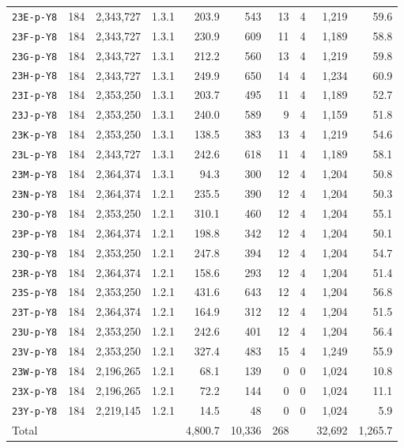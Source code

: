 \documentclass[11pt]{amsart}
\theoremstyle{definition}
\theoremstyle{remark}
\begin{document}
\begin{table}[ht]
\begin{tabular}{@{}lrrcrrrrrr@{}}
\texttt{23E-p-Y8} & 184 & 2{,}343{,}727 & 1.3.1 & 203.9 & 543 & 13 & 4 & 1{,}219 & 59.6 \\
\texttt{23F-p-Y8} & 184 & 2{,}343{,}727 & 1.3.1 & 230.9 & 609 & 11 & 4 & 1{,}189 & 58.8 \\
\texttt{23G-p-Y8} & 184 & 2{,}343{,}727 & 1.3.1 & 212.2 & 560 & 13 & 4 & 1{,}219 & 59.8 \\
\texttt{23H-p-Y8} & 184 & 2{,}343{,}727 & 1.3.1 & 249.9 & 650 & 14 & 4 & 1{,}234 & 60.9 \\
\texttt{23I-p-Y8} & 184 & 2{,}353{,}250 & 1.3.1 & 203.7 & 495 & 11 & 4 & 1{,}189 & 52.7 \\
\texttt{23J-p-Y8} & 184 & 2{,}353{,}250 & 1.3.1 & 240.0 & 589 & 9 & 4 & 1{,}159 & 51.8 \\
\texttt{23K-p-Y8} & 184 & 2{,}353{,}250 & 1.3.1 & 138.5 & 383 & 13 & 4 & 1{,}219 & 54.6 \\
\texttt{23L-p-Y8} & 184 & 2{,}343{,}727 & 1.3.1 & 242.6 & 618 & 11 & 4 & 1{,}189 & 58.1 \\
\texttt{23M-p-Y8} & 184 & 2{,}364{,}374 & 1.3.1 & 94.3 & 300 & 12 & 4 & 1{,}204 & 50.8 \\
\texttt{23N-p-Y8} & 184 & 2{,}364{,}374 & 1.2.1 & 235.5 & 390 & 12 & 4 & 1{,}204 & 50.3 \\
\texttt{23O-p-Y8} & 184 & 2{,}353{,}250 & 1.2.1 & 310.1 & 460 & 12 & 4 & 1{,}204 & 55.1 \\
\texttt{23P-p-Y8} & 184 & 2{,}364{,}374 & 1.2.1 & 198.8 & 342 & 12 & 4 & 1{,}204 & 50.1 \\
\texttt{23Q-p-Y8} & 184 & 2{,}353{,}250 & 1.2.1 & 247.8 & 394 & 12 & 4 & 1{,}204 & 54.7 \\
\texttt{23R-p-Y8} & 184 & 2{,}364{,}374 & 1.2.1 & 158.6 & 293 & 12 & 4 & 1{,}204 & 51.4 \\
\texttt{23S-p-Y8} & 184 & 2{,}353{,}250 & 1.2.1 & 431.6 & 643 & 12 & 4 & 1{,}204 & 56.8 \\
\texttt{23T-p-Y8} & 184 & 2{,}364{,}374 & 1.2.1 & 164.9 & 312 & 12 & 4 & 1{,}204 & 51.5 \\
\texttt{23U-p-Y8} & 184 & 2{,}353{,}250 & 1.2.1 & 242.6 & 401 & 12 & 4 & 1{,}204 & 56.4 \\
\texttt{23V-p-Y8} & 184 & 2{,}353{,}250 & 1.2.1 & 327.4 & 483 & 15 & 4 & 1{,}249 & 55.9 \\
\texttt{23W-p-Y8} & 184 & 2{,}196{,}265 & 1.2.1 & 68.1 & 139 & 0 & 0 & 1{,}024 & 10.8 \\
\texttt{23X-p-Y8} & 184 & 2{,}196{,}265 & 1.2.1 & 72.2 & 144 & 0 & 0 & 1{,}024 & 11.1 \\
\texttt{23Y-p-Y8} & 184 & 2{,}219{,}145 & 1.2.1 & 14.5 & 48 & 0 & 0 & 1{,}024 & 5.9 \\
\midrule
Total & & & & 4{,}800.7 & 10{,}336 & 268 & & 32{,}692 & 1{,}265.7 \\
\bottomrule
\end{tabular}
\end{table}
\end{document}
